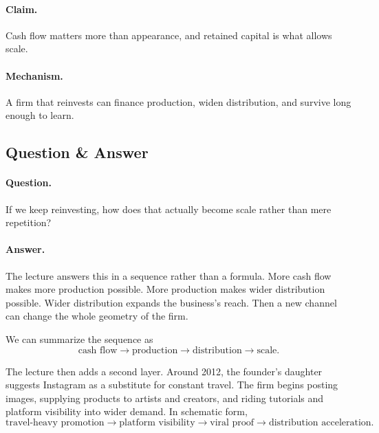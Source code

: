 \paragraph{Claim.} Cash flow matters more than appearance, and retained capital is what allows scale.

\paragraph{Mechanism.} A firm that reinvests can finance production, widen distribution, and survive long enough to learn.

\subsection{Question \& Answer}

\paragraph{Question.} If we keep reinvesting, how does that actually become scale rather than mere repetition?

\paragraph{Answer.} The lecture answers this in a sequence rather than a formula. More cash flow makes more production possible. More production makes wider distribution possible. Wider distribution expands the business's reach. Then a new channel can change the whole geometry of the firm.

We can summarize the sequence as
\begin{equation}
\text{cash flow} \rightarrow \text{production} \rightarrow \text{distribution} \rightarrow \text{scale}.
\end{equation}

The lecture then adds a second layer. Around 2012, the founder's daughter suggests Instagram as a substitute for constant travel. The firm begins posting images, supplying products to artists and creators, and riding tutorials and platform visibility into wider demand. In schematic form,
\begin{equation}
\text{travel-heavy promotion} \rightarrow \text{platform visibility} \rightarrow \text{viral proof} \rightarrow \text{distribution acceleration}.
\end{equation}

